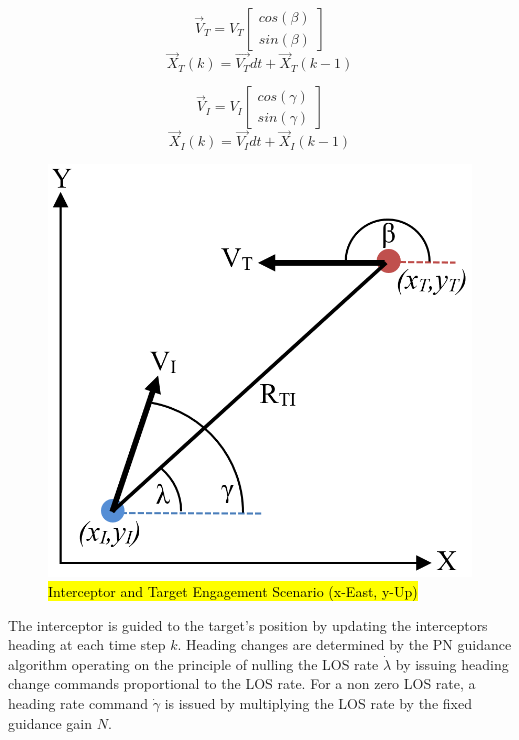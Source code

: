 \documentclass[conference]{IEEEtran}
\begin{document}
\begin{equation}\label{eq:targetkin}
\overrightarrow{V}_{T} =  V_{T} \begin{bmatrix} cos(\beta) \\ sin(\beta) \end{bmatrix}
\end{equation}
\begin{equation}\label{eq:targetkintwo}
\overrightarrow{X}_T(k) =  \overrightarrow{V_T}dt + \overrightarrow{X}_T(k-1) 
\end{equation}

\begin{equation}\label{eq:intkin}
\overrightarrow{V}_{I} =  V_{I} \begin{bmatrix} cos(\gamma) \\ sin(\gamma) \end{bmatrix}
\end{equation}
\begin{equation}\label{eq:intkintwo}
\overrightarrow{X}_I(k) =  \overrightarrow{V_I}dt + \overrightarrow{X}_I(k-1) 
\end{equation}





\begin{figure}[H]
	\centering
	\includegraphics[width=6 cm]{Engagement_Model.PNG}
	\caption{\hl{Interceptor and Target Engagement Scenario (x-East, y-Up)}}
	\label{fig:Egagement}
\end{figure}

The interceptor is guided to the target's position by updating the interceptors heading at each time step $k$. Heading changes are determined by the PN guidance algorithm operating on the principle of nulling the LOS rate $\dot{\lambda}$ by issuing heading change commands proportional to the LOS rate. For a non zero LOS rate, a heading rate command $\dot{\gamma}$ is issued by multiplying the LOS rate by the fixed guidance gain $N$.
\end{document}
